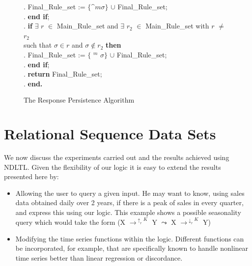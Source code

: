 {\begin{figure}[ht]
\begin{center}
{\begin{minipage}{16cm}
\begin{algorithm}
\begin{rm}
\begin{tabbing}
\sa.  \> \> \> \> Final\_Rule\_set := $\{ \bm^m \sigma  \}$ $\cup$ Final\_Rule\_set; \\
\sa.  \> \> \> {\bf end if};\\
\sa.  \> \> \> {\bf if } $\exists$ $r$ $\in$ Main\_Rule\_set and $\exists$ $r_2$
$\in$ Main\_Rule\_set with $r$ $\not=$ $r_2$ \\ 
\> \> \> \> \> such that $\sigma \in r$ and $\sigma \not\in r_2$ {\bf then} \\
\sa.  \> \> \> \> Final\_Rule\_set := $\{$ \diam$^m$ $\sigma \}$ $\cup$ Final\_Rule\_set;\\
\sa.  \> \> \> {\bf end if};\\

\sa.  \> \> \> {\bf return} Final\_Rule\_set; \\
\sa. \> \> {\bf end.}
\end{tabbing}
\end{rm}
\end{algorithm}
\end{minipage}}
\caption{\label{tr:fig:resp} The Response Persistence Algorithm}
\end{center}
\end{figure}
}




\section{Relational Sequence Data Sets}\label{sec:tr_relseq}

We now discuss the experiments carried out and the results achieved
using NDLTL. Given the flexibility of our logic it is easy to extend
the results presented here by: 
\begin{itemize}
\item Allowing the user to query a given input. He may want to know,
using sales data obtained daily over 2 years, if there is a peak of sales in every quarter, and
express this using our logic. This example shows a possible
seasonality query which would take the form \linebreak[4]  (X
$\to^{\uparrow_r K}$ Y $\leadsto$ X $\to^{\downarrow_r K}$ Y)
\item Modifying the time series functions within the logic. Different
functions can be incorporated, for example, that are specifically
known to handle nonlinear time series better than linear regression or
discordance.
\end{itemize}

